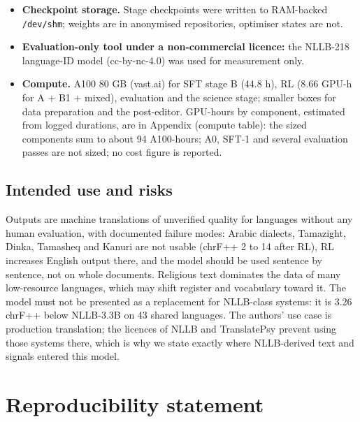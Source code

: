 \begin{itemize}
\item \textbf{Checkpoint storage.} Stage checkpoints were written to RAM-backed \texttt{/\allowbreak{}dev/\allowbreak{}shm}; weights are in anonymised repositories, optimiser states are not.
\item \textbf{Evaluation-only tool under a non-commercial licence:} the NLLB-218 language-ID model (cc-by-nc-4.0) was used for measurement only.
\item \textbf{Compute.} A100 80 GB (vast.ai) for SFT stage B (44.8 h), RL (8.66 GPU-h for A + B1 + mixed), evaluation and the science stage; smaller boxes for data preparation and the post-editor. GPU-hours by component, estimated from logged durations, are in Appendix (compute table): the sized components sum to about 94 A100-hours; A0, SFT-1 and several evaluation passes are not sized; no cost figure is reported.
\end{itemize}

\subsection{Intended use and risks}


Outputs are machine translations of unverified quality for languages without any human evaluation, with documented failure modes: Arabic dialects, Tamazight, Dinka, Tamasheq and Kanuri are not usable (chrF++ 2 to 14 after RL), RL increases English output there, and the model should be used sentence by sentence, not on whole documents. Religious text dominates the data of many low-resource languages, which may shift register and vocabulary toward it. The model must not be presented as a replacement for NLLB-class systems: it is 3.26 chrF++ below NLLB-3.3B on 43 shared languages. The authors' use case is production translation; the licences of NLLB and TranslatePsy prevent using those systems there, which is why we state exactly where NLLB-derived text and signals entered this model.

\section{Reproducibility statement}\label{app:repro}


